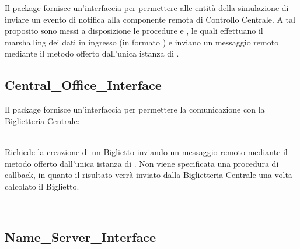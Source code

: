 	Il package  fornisce un'interfaccia per permettere alle entità della simulazione di inviare un evento di notifica alla componente remota di Controllo Centrale. A tal proposito sono messi a disposizione le procedure  e , le quali effettuano il marshalling dei dati in ingresso (in formato ) e inviano un messaggio remoto mediante il metodo  offerto dall'unica istanza di .
	
	\subsection{Central\_Office\_Interface}
	
	Il package  fornisce un'interfaccia per permettere la comunicazione con la Biglietteria Centrale:
		\begin{description}
			\item {} \\
			Richiede la creazione di un Biglietto inviando un messaggio remoto mediante il metodo  offerto dall'unica istanza di . Non viene specificata una procedura di callback, in quanto il risultato verrà inviato dalla Biglietteria Centrale una volta calcolato il Biglietto.
			
			\item {}\\
				
		\end{description}
	
	\subsection{Name\_Server\_Interface}
	
